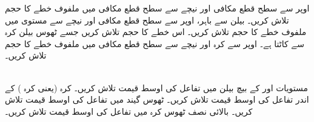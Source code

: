 اوپر سے سطح قطع مکافی  اور نیچے سے سطح قطع مکافی  میں ملفوف خطے کا حجم تلاش کریں۔
 بیلن  سے باہر،  اوپر سے سطح قطع مکافی  اور  نیچے سے مستوی  میں ملفوف    خطے  کا حجم تلاش کریں۔
اس خطے کا حجم تلاش کریں جسے ٹھوس بیلن   کرہ  سے کاٹتا ہے۔
اوپر سے کرہ  اور نیچے سے سطح قطع مکافی  میں ملفوف خطے کا حجم تلاش کریں۔

\\

مستویات  اور  کے بیچ بیلن   میں تفاعل  کی اوسط قیمت    تلاش کریں۔
کرہ  (یعنی کرہ )  کے اندر  تفاعل  کی اوسط قیمت تلاش کریں۔
ٹھوس گیند   میں تفاعل  کی اوسط قیمت تلاش کریں۔
بالائی نصف ٹھوس کرہ   میں تفاعل  کی اوسط قیمت تلاش کریں۔

